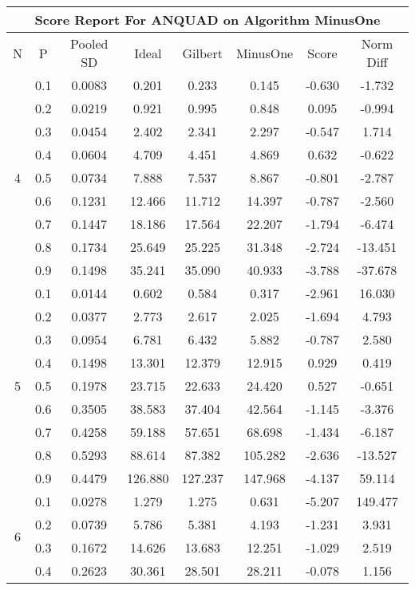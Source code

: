 \documentclass[11pt,a4paper]{report}
\begin{document}
\begin{longtable}{ | c | c || c | c | c | c | c | c | }
\hline
\multicolumn{8}{|c|}{ Score Report For ANQUAD on Algorithm MinusOne} \\
\hline
N & P & Pooled SD &  Ideal &  Gilbert & MinusOne  & Score & Norm Diff \\
 \hline
 \hline
 \endhead
\multirow{9}{*}{4} & 0.1 & 0.0083 & 0.201 & 0.233 & 0.145 & -0.630 & -1.732 \\
 & 0.2 & 0.0219 & 0.921 & 0.995 & 0.848 & 0.095 & -0.994 \\
 & 0.3 & 0.0454 & 2.402 & 2.341 & 2.297 & -0.547 & 1.714 \\
 & 0.4 & 0.0604 & 4.709 & 4.451 & 4.869 & 0.632 & -0.622 \\
 & 0.5 & 0.0734 & 7.888 & 7.537 & 8.867 & -0.801 & -2.787 \\
 & 0.6 & 0.1231 & 12.466 & 11.712 & 14.397 & -0.787 & -2.560 \\
 & 0.7 & 0.1447 & 18.186 & 17.564 & 22.207 & -1.794 & -6.474 \\
 & 0.8 & 0.1734 & 25.649 & 25.225 & 31.348 & -2.724 & -13.451 \\
 & 0.9 & 0.1498 & 35.241 & 35.090 & 40.933 & -3.788 & -37.678 \\
 \hline
\multirow{9}{*}{5} & 0.1 & 0.0144 & 0.602 & 0.584 & 0.317 & -2.961 & 16.030 \\
 & 0.2 & 0.0377 & 2.773 & 2.617 & 2.025 & -1.694 & 4.793 \\
 & 0.3 & 0.0954 & 6.781 & 6.432 & 5.882 & -0.787 & 2.580 \\
 & 0.4 & 0.1498 & 13.301 & 12.379 & 12.915 & 0.929 & 0.419 \\
 & 0.5 & 0.1978 & 23.715 & 22.633 & 24.420 & 0.527 & -0.651 \\
 & 0.6 & 0.3505 & 38.583 & 37.404 & 42.564 & -1.145 & -3.376 \\
 & 0.7 & 0.4258 & 59.188 & 57.651 & 68.698 & -1.434 & -6.187 \\
 & 0.8 & 0.5293 & 88.614 & 87.382 & 105.282 & -2.636 & -13.527 \\
 & 0.9 & 0.4479 & 126.880 & 127.237 & 147.968 & -4.137 & 59.114 \\
 \hline
\multirow{9}{*}{6} & 0.1 & 0.0278 & 1.279 & 1.275 & 0.631 & -5.207 & 149.477 \\
 & 0.2 & 0.0739 & 5.786 & 5.381 & 4.193 & -1.231 & 3.931 \\
 & 0.3 & 0.1672 & 14.626 & 13.683 & 12.251 & -1.029 & 2.519 \\
 & 0.4 & 0.2623 & 30.361 & 28.501 & 28.211 & -0.078 & 1.156 \\

\end{longtable}
\end{document}
